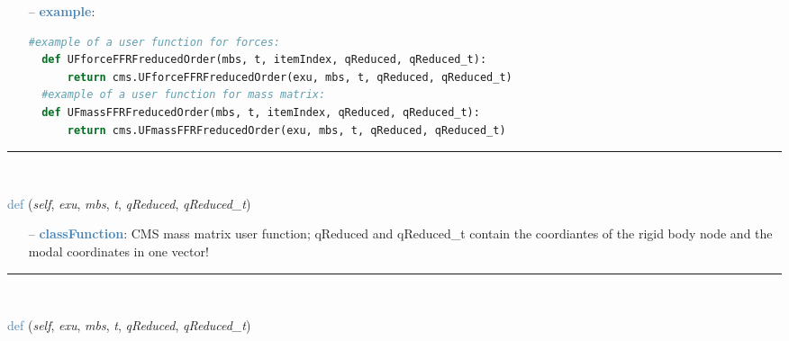 \begin{itemize}[leftmargin=1.4cm]
\begin{itemize}[leftmargin=1.4cm]
\begin{itemize}[leftmargin=1.4cm]
\begin{itemize}[leftmargin=0.5cm]
\begin{itemize}[leftmargin=1.4cm]
\begin{itemize}[leftmargin=1.4cm]
\begin{itemize}[leftmargin=1.4cm]
\begin{itemize}[leftmargin=0.5cm]
\begin{itemize}[leftmargin=0.7cm]
\begin{itemize}[leftmargin=1.2cm]
\end{itemize}
\item[--]\textcolor{steelblue}{\bf example}: \vspace{-12pt}\ei\begin{lstlisting}[language=Python, xleftmargin=36pt]
  #example of a user function for forces:
  def UFforceFFRFreducedOrder(mbs, t, itemIndex, qReduced, qReduced_t):
      return cms.UFforceFFRFreducedOrder(exu, mbs, t, qReduced, qReduced_t)
  #example of a user function for mass matrix:
  def UFmassFFRFreducedOrder(mbs, t, itemIndex, qReduced, qReduced_t):
      return cms.UFmassFFRFreducedOrder(exu, mbs, t, qReduced, qReduced_t)
\end{lstlisting}\vspace{-24pt}\bi\item[]\vspace{-24pt}\vspace{12pt}\end{itemize}
%
\noindent\rule{8cm}{0.75pt}\vspace{1pt} \\ 
\begin{flushleft}
\noindent \textcolor{steelblue}{def {\bf {}}}\label{sec:FEM:ObjectFFRFreducedOrderInterface:UFmassFFRFreducedOrder}
({\it self}, {\it exu}, {\it mbs}, {\it t}, {\it qReduced}, {\it qReduced\_t})
\end{flushleft}
\setlength{\itemindent}{0.7cm}
\begin{itemize}[leftmargin=0.7cm]
\item[--]\textcolor{steelblue}{\bf classFunction}: CMS mass matrix user function; qReduced and qReduced_t contain the coordiantes of the rigid body node and the modal coordinates in one vector!
\vspace{12pt}\end{itemize}
%
\noindent\rule{8cm}{0.75pt}\vspace{1pt} \\ 
\begin{flushleft}
\noindent \textcolor{steelblue}{def {\bf {}}}\label{sec:FEM:ObjectFFRFreducedOrderInterface:UFforceFFRFreducedOrder}
({\it self}, {\it exu}, {\it mbs}, {\it t}, {\it qReduced}, {\it qReduced\_t})
\end{flushleft}
\setlength{\itemindent}{0.7cm}
\begin{itemize}[leftmargin=0.7cm]

\end{itemize}
\end{itemize}
\end{itemize}
\end{itemize}
\end{itemize}
\end{itemize}
\end{itemize}
\end{itemize}
\end{itemize}
